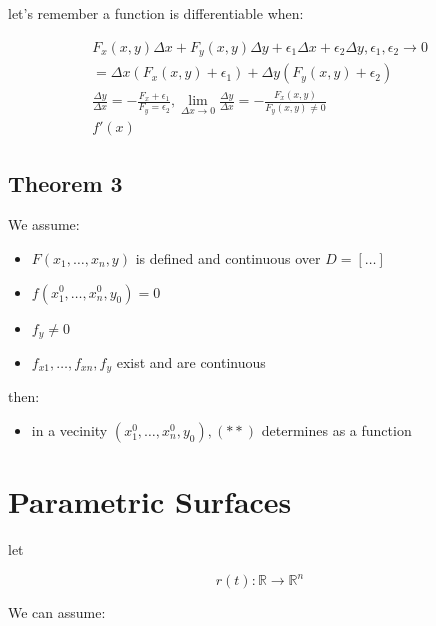 \documentclass[11pt,fleqn]{book} %
\begin{document}
let's remember a function is differentiable when:

\begin{gather}
    F_x (x,y) \Delta x + F_y (x,y) \Delta y + \epsilon_1 \Delta x + \epsilon_2 \Delta y, \epsilon_1, \epsilon_2 \rightarrow 0 \\
    = \Delta x (F_x(x,y) + \epsilon_1) + \Delta y (F_y (x,y)+ \epsilon_2) \\
    \frac{\Delta y}{\Delta x} = - \frac{F_x + \epsilon_1}{F_y = \epsilon_2}, \lim_{\Delta x \to 0} \frac{\Delta y}{\Delta x} = - \frac{F_x(x,y)}{F_y(x,y) \neq 0}\\
    f'(x)
\end{gather}

\subsection{Theorem 3}

We assume:
\begin{itemize}
    \item $F(x_1,\dots,x_n, y)$ is defined and continuous over $D = [\dots]$
    \item $f(x_1^0,\dots,x_n^0,y_0) = 0$
    \item $f_y \neq 0$
    \item $f_{x1}, \dots, f_{xn}, f_y$ exist and are continuous
\end{itemize}

then:

\begin{itemize}
    \item in a vecinity $(x_1^0, \dots, x_n^0, y_0),(**)$ determines as a function
\end{itemize}

\section{Parametric Surfaces}

let 

$$r(t): \mathbb{R} \to \mathbb{R}^n$$

We can assume:
\end{document}
